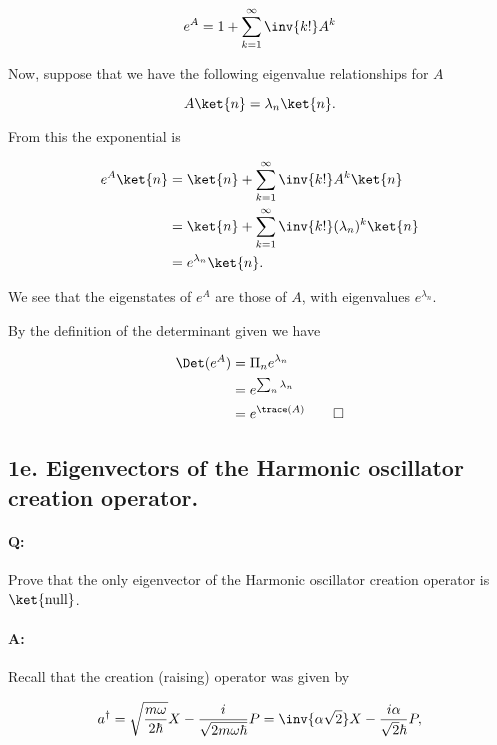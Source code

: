\begin{equation}\label{eqn:qmIexamPractice2008Dec:1d:20}
e^A = 1 + \sum_{k=1}^\infty \inv{k!} A^k
\end{equation}

Now, suppose that we have the following eigenvalue relationships for $A$

\begin{equation}\label{eqn:qmIexamPractice2008Dec:1d:30}
A \ket{n} = \lambda_n \ket{n}.
\end{equation}

From this the exponential is

\begin{align*}
e^A \ket{n} 
&= \ket{n} + \sum_{k=1}^\infty \inv{k!} A^k \ket{n} \\
&= \ket{n} + \sum_{k=1}^\infty \inv{k!} (\lambda_n)^k \ket{n} \\
&= e^{\lambda_n} \ket{n}.
\end{align*}

We see that the eigenstates of $e^A$ are those of $A$, with eigenvalues $e^{\lambda_n}$.

By the definition of the determinant given we have

\begin{align*}
\Det( e^A ) 
&= \Pi_n e^{\lambda_n} \\
&= e^{\sum_n \lambda_n} \\
&= e^{\trace(A)} \qquad \square
\end{align*}

\subsection{1e.  Eigenvectors of the Harmonic oscillator creation operator.}

\paragraph{Q:} Prove that the only eigenvector of the Harmonic oscillator creation operator is $\ket{\text{null}}$.

\paragraph{A:} 

Recall that the creation (raising) operator was given by

\begin{equation}\label{eqn:qmIexamPractice2008Dec:1e:10}
a^\dagger 
= \sqrt{\frac{m \omega}{2 \hbar}} X - \frac{ i }{\sqrt{2 m \omega \hbar} } P
= \inv{ \alpha \sqrt{2} } X - \frac{ i \alpha }{\sqrt{2} \hbar } P,
\end{equation}

